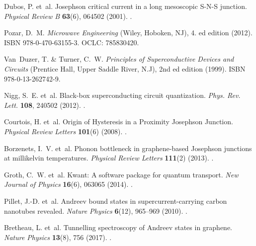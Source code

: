 \documentclass[preprint,
  onecolumn,
  notitlepage,
  amsmath,amssymb,
  aip,
  apl,
]{revtex4-1}
\begin{document}
\begin{thebibliography}{10}
    Dubos, P. et~al.
    \newblock Josephson critical current in a long mesoscopic {{S}}-{{N}}-{{S}}
      junction.
    \newblock \emph{Physical Review B} \textbf{63}(6), 064502 (2001).
    \newblock {}.

    Pozar, D.~M.
    \newblock \emph{Microwave Engineering} ({Wiley}, Hoboken, NJ), 4. ed edition
      (2012).
    \newblock ISBN 978-0-470-63155-3.
    \newblock OCLC: 785830420.

    Van~Duzer, T. \& Turner, C.~W.
    \newblock \emph{Principles of Superconductive Devices and Circuits} ({Prentice
      Hall}, Upper Saddle River, N.J), 2nd ed edition (1999).
    \newblock ISBN 978-0-13-262742-9.

    Nigg, S.~E. et~al.
    \newblock Black-box superconducting circuit quantization.
    \newblock \emph{Phys. Rev. Lett.} \textbf{108}, 240502 (2012).
    \newblock {}.

    Courtois, H. et~al.
    \newblock Origin of {{Hysteresis}} in a {{Proximity Josephson Junction}}.
    \newblock \emph{Physical Review Letters} \textbf{101}(6) (2008).
    \newblock {}.

    Borzenets, I.~V. et~al.
    \newblock Phonon bottleneck in graphene-based {{Josephson}} junctions at
      millikelvin temperatures.
    \newblock \emph{Physical Review Letters} \textbf{111}(2) (2013).
    \newblock {}.

    Groth, C.~W. et~al.
    \newblock Kwant: A software package for quantum transport.
    \newblock \emph{New Journal of Physics} \textbf{16}(6), 063065 (2014).
    \newblock {}.

    Pillet, J.-D. et~al.
    \newblock Andreev bound states in supercurrent-carrying carbon nanotubes
      revealed.
    \newblock \emph{Nature Physics} \textbf{6}(12), 965--969 (2010).
    \newblock {}.

    Bretheau, L. et~al.
    \newblock Tunnelling spectroscopy of {{Andreev}} states in graphene.
    \newblock \emph{Nature Physics} \textbf{13}(8), 756 (2017).
    \newblock {}.
\end{thebibliography}
\end{document}
